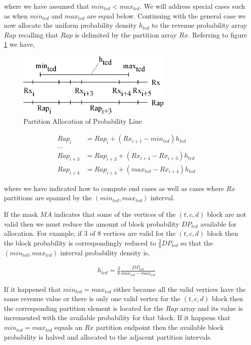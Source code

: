 where we have assumed that $min_{tcd} < max_{tcd}$. We will address
special cases such as when $min_{tcd}$ and $max_{tcd}$ are equal
below. Continuing with the general case we now allocate the
uniform probability density $h_{tcd}$ to the revenue probability array
$Rap$ recalling that $Rap$ is delimited by the partition array
$Rx$. Referring to figure \ref{fig:line_projection} we have,

\begin{figure}
  \centering
  \includegraphics[width=3in]{Images/line_projection}
  \caption[Partition Allocation of Probability Line]
          {Partition Allocation of Probability Line}
  \label{fig:line_projection}
\end{figure}

\begin{align*}
Rap_i &= Rap_i + (Rx_{i+1} - min_{tcd}) h_{tcd}\\
\dots\\
Rap_{i+3} &= Rap_{i+3} + (Rx_{i+4} - Rx_{i+3}) h_{tcd}\\
Rap_{i+4} &= Rap_{i+4} + (max_{tcd} - Rx_{i+4}) h_{tcd} 
\end{align*}

where we have indicated how to compute end cases as well as cases
where $Rx$ partitions are spanned by the $(min_{tcd}, max_{tcd})$
interval. 

If the mask $MA$ indicates that some of the vertices of the $(t,c,d)$
block are not valid then we must reduce the amount of block
probability $DP_{tcd}$ available for allocation. For example, if $3$
of $8$ vertices are valid for the $(t,c,d)$ block then the block
probability is correspondingly reduced to $\frac{3}{8}DP_{tcd}$ so
that the $(min_{tcd}, max_{tcd})$ interval probability density is,

\begin{align*}
h_{tcd} = \frac{3}{8}\frac{DP_{tcd}}{max_{tcd} - max_{tcd}}
\end{align*}

If it happened that $min_{tcd} = max_{tcd}$ either because all the
valid vertices have the same revenue value or there is only one valid
vertex for the $(t,c,d)$ block then the corresponding partition
element is located for the $Rap$ array and its value is incremented
with the available probability for that block. If it happens that
$min_{tcd} = max_{tcd}$ equals an $Rx$ partition endpoint then the
available block probability is halved and allocated to the adjacent
partition intervals.

